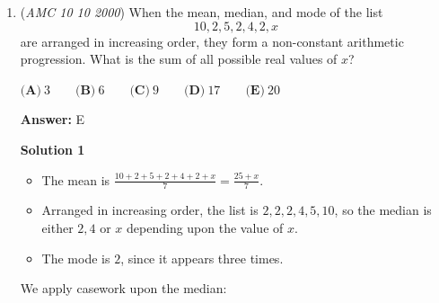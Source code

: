 \begin{enumerate}
 



\textbf{Solution 8}

If we let the amount of milk in total be $m$ and the amount of coffee in total be $c$ then we have that Angela drank is $\frac{c}{6} + \frac{m}{4} = 8~\textrm{oz}$. We can subtract 4 times the amount Angela drank to cancel out the milk to get
 \[m + c - 4\left(\frac{m}{4} + \frac{c}6\right) = \frac{2c}6 = \frac{c}3\]is a multiple of $8$ ounces.From this we can find that we must have $\frac{c}3 = 8~\textrm{oz.}$, if we had $\frac{c}3 = 16~\textrm{oz.}$ then we would have $\frac{c}6 = 8~\textrm{oz.}$ which would mean that Angela drank no coffee (contradiction) and if we had $\frac{c}3 = 0~\textrm{oz.}$ then there would be no coffee in total (contradiction) and if $\frac{2c}6$ is greater than $16$ ounces then Angela would have had to drink more than $8$ ounces of liquid (contradiction).From this we know the total amount of coffee is $3\cdot\frac{c}3 = 3\cdot8~\textrm{oz} = 24$ ounces and Angela drank $24\cdot\frac16 = 4$ ounces of coffee from this we know Angela drank $8 - 4 = 4$ ounces of milk. Therefore we have the total coffee plus the total milk equals $4\cdot4~\textrm{oz.} + 6\cdot4~\textrm{oz.} = 40~\textrm{oz.}$. Hence as each person drank $8$ ounces we have a total of $40/8 = 5$ people in Angela's family which means the answer is $\boxed{\text{(C)}}$.

 


 \textbf{Sidenote} If we now solve for $c$ and $m$, we find that $m=16$ and $c=24$. Thus in total the family drank $16$ ounces of milk and $24$ ounces of coffee. Angela drank exactly $4$ ounces of milk and $4$ ounces of coffee.

 


	\item (\textit{AMC 10 10 2000}) When the mean, median, and mode of the list 
 \[10,2,5,2,4,2,x\] are arranged in increasing order, they form a non-constant arithmetic progression. What is the sum of all possible real values of $x$?


 $\textbf{(A)}\ 3 \qquad\textbf{(B)}\ 6 \qquad\textbf{(C)}\ 9 \qquad\textbf{(D)}\ 17 \qquad\textbf{(E)}\ 20$

 \textbf{Answer: }E



\textbf{Solution 1}


            \begin{itemize}
        \item The mean is $\frac{10+2+5+2+4+2+x}{7} = \frac{25+x}{7}$.
        \item Arranged in increasing order, the list is $2,2,2,4,5,10$, so the median is either $2,4$ or $x$ depending upon the value of $x$.
        \item The mode is $2$, since it appears three times.
            \end{itemize}
            We apply casework upon the median:


\end{enumerate}
